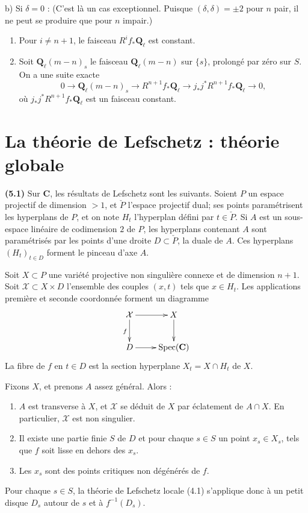 \documentclass[12pt,a4paper]{amsart}
\theoremstyle{plain}
\theoremstyle{definition}
\theoremstyle{remark}
\DeclareMathOperator{\Spec}{Spec}
\newcommand{\Q}{\mathbf{Q}}
\newcommand{\C}{\mathbf{C}}
\numberwithin{equation}{section}
\begin{document}
b) Si $\delta=0$ : (C'est l\`a un cas exceptionnel. Puisque $(\delta,\delta)=\pm 2$ pour $n$ pair, il ne peut se produire que pour $n$ impair.)
\begin{enumerate}
\item[1)] Pour $i\not=n+1$, le faisceau $R^i f_\ast\Q_\ell$ est constant.
\item[2)] Soit $\Q_\ell(m-n)_s$ le faisceau $\Q_\ell(m-n)$ sur $\{s\}$, prolong\'e par z\'ero sur $S$. On a une suite exacte
\[
0 \longrightarrow \Q_\ell(m-n)_s \longrightarrow R^{n+1} f_\ast\Q_\ell \longrightarrow j_\ast j^\ast R^{n+1} f_\ast\Q_\ell \longrightarrow 0,
\]
o\`u $j_\ast j^\ast R^{n+1} f_\ast\Q_\ell$ est un faisceau constant.
\end{enumerate}


\section{La th\'eorie de Lefschetz : th\'eorie globale}

\noindent \textbf{(5.1)} Sur $\C$, les r\'esultats de Lefschetz sont les suivants. Soient $P$ un espace projectif de dimension $>1$, et $\check{P}$ l'espace projectif dual; ses points param\'etrisent les hyperplans de $P$, et on note $H_t$ l'hyperplan d\'efini par $t\in\check{P}$. Si $A$ est un sous-espace lin\'eaire de codimension $2$ de $P$, les hyperplans contenant $A$ sont param\'etris\'es par les points d'une droite $D\subset\check{P}$, la duale de $A$. Ces hyperplans $(H_t)_{t\in D}$ forment le pinceau d'axe $A$.

Soit $X\subset P$ une vari\'et\'e projective non singuli\`ere connexe et de dimension $n+1$. Soit $\mathcal{X}\subset X\times D$ l'ensemble des couples $(x,t)$ tels que $x\in H_t$. Les applications premi\`ere et seconde coordonn\'ee forment un diagramme
\begin{equation}\label{eq:5.1.1}
\xymatrix{
\mathcal{X} \ar[r] \ar[d]_f & X \ar[d] \\
D \ar[r] & \Spec(\C)
}
\end{equation}
La fibre de $f$ en $t\in D$ est la section hyperplane $X_t=X\cap H_t$ de $X$.

Fixons $X$, et prenons $A$ assez g\'en\'eral. Alors :
\begin{enumerate}
\item[A)] $A$ est transverse \`a $X$, et $\mathcal{X}$ se d\'eduit de $X$ par \'eclatement de $A\cap X$. En particulier, $\mathcal{X}$ est non singulier.
\item[B)] Il existe une partie finie $S$ de $D$ et pour chaque $s\in S$ un point $x_s\in X_s$, tels que $f$ soit lisse en dehors des $x_s$.
\item[C)] Les $x_s$ sont des points critiques non d\'eg\'en\'er\'es de $f$.
\end{enumerate}
Pour chaque $s\in S$, la th\'eorie de Lefschetz locale (4.1) s'applique donc \`a un petit disque $D_s$ autour de $s$ et \`a $f^{-1}(D_s)$.
\end{document}
